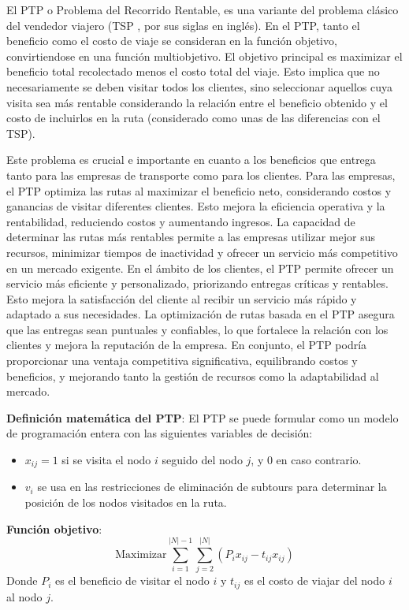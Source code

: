 \begin{enumerate}
\begin{itemize}
        El PTP o Problema del Recorrido Rentable, es una variante del problema clásico del vendedor viajero (TSP \cite{LAPORTE1992231}, por sus siglas en inglés). En el PTP, tanto el beneficio como el costo de viaje se consideran en la función objetivo, convirtiendose en una función multiobjetivo. El objetivo principal es maximizar el beneficio total recolectado menos el costo total del viaje. Esto implica que no necesariamente se deben visitar todos los clientes, sino seleccionar aquellos cuya visita sea más rentable considerando la relación entre el beneficio obtenido y el costo de incluirlos en la ruta (considerado como unas de las diferencias con el TSP).

        Este problema es crucial e importante en cuanto a los beneficios que entrega tanto para las empresas de transporte como para los clientes. Para las empresas, el PTP optimiza las rutas al maximizar el beneficio neto, considerando costos y ganancias de visitar diferentes clientes. Esto mejora la eficiencia operativa y la rentabilidad, reduciendo costos y aumentando ingresos. La capacidad de determinar las rutas más rentables permite a las empresas utilizar mejor sus recursos, minimizar tiempos de inactividad y ofrecer un servicio más competitivo en un mercado exigente. En el ámbito de los clientes, el PTP permite ofrecer un servicio más eficiente y personalizado, priorizando entregas críticas y rentables. Esto mejora la satisfacción del cliente al recibir un servicio más rápido y adaptado a sus necesidades. La optimización de rutas basada en el PTP asegura que las entregas sean puntuales y confiables, lo que fortalece la relación con los clientes y mejora la reputación de la empresa. En conjunto, el PTP podría proporcionar una ventaja competitiva significativa, equilibrando costos y beneficios, y mejorando tanto la gestión de recursos como la adaptabilidad al mercado.

        \textbf{Definición matemática del PTP}: El PTP se puede formular como un modelo de programación entera con las siguientes variables de decisión:
        \begin{itemize}
            \item $x_{ij} = 1$ si se visita el nodo $i$ seguido del nodo $j$, y 0 en caso contrario.
            \item $v_i$ se usa en las restricciones de eliminación de subtours para determinar la posición de los nodos visitados en la ruta.
        \end{itemize}

        \textbf{Función objetivo}:
        \[
            \text{Maximizar} \sum_{i=1}^{|N|-1} \sum_{j=2}^{|N|} (P_i x_{ij} - t_{ij} x_{ij})
        \]
        Donde $P_i$ es el beneficio de visitar el nodo $i$ y $t_{ij}$ es el costo de viajar del nodo $i$ al nodo $j$.


\end{itemize}
\end{enumerate}
